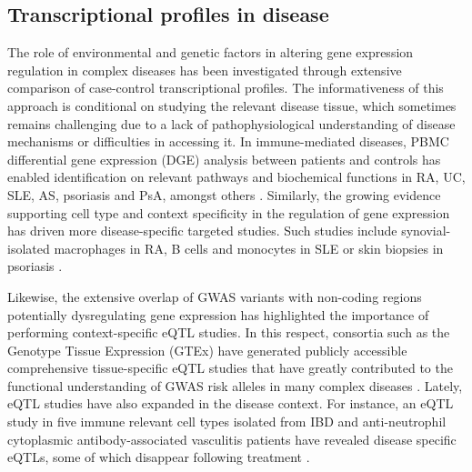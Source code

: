 \subsection{Transcriptional profiles in disease}
The role of environmental and genetic factors in altering gene expression regulation in complex diseases has been investigated through extensive comparison of case-control transcriptional profiles. The informativeness of this approach is conditional on studying the relevant disease tissue, which sometimes remains challenging due to a lack of pathophysiological understanding of disease mechanisms or difficulties in accessing it. In immune-mediated diseases, PBMC differential gene expression (DGE) analysis between patients and controls has enabled identification on relevant pathways and biochemical functions in RA, UC, SLE, AS, psoriasis and PsA, amongst others \parencite{Miao2013,Junta2009,Baechler2003,Assassi2010,Batliwalla2005}.  Similarly, the growing evidence supporting cell type and context specificity in the regulation of gene expression has driven more disease-specific targeted studies. Such studies include synovial-isolated macrophages in RA, B cells and monocytes in SLE or skin biopsies in psoriasis \parencite{Katschke2001,Dozmorov2015,Jabbari2012}. 


Likewise, the extensive overlap of GWAS variants with non-coding regions potentially dysregulating gene expression has highlighted the importance of performing context-specific eQTL studies. In this respect, consortia such as the Genotype Tissue Expression (GTEx) have generated publicly accessible comprehensive tissue-specific eQTL studies that have greatly contributed to the functional understanding of GWAS risk alleles in many complex diseases \parencite{Londsdale2013,Fagny2017}. Lately, eQTL studies have also expanded in the disease context. For instance, an eQTL study in five immune relevant cell types isolated from IBD and anti-neutrophil cytoplasmic antibody-associated vasculitis patients have revealed disease specific eQTLs, some of which disappear following treatment \parencite{Peters2016}.

